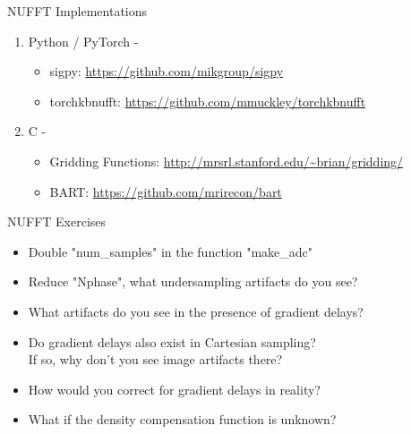 \begin{frame}{NUFFT Implementations}
    \begin{enumerate}
        \item Python / PyTorch -
        \vspace{1em}
        \begin{itemize}
            \item sigpy: \url{https://github.com/mikgroup/sigpy}
            \vspace{0.5em}
            \item torchkbnufft: \url{https://github.com/mmuckley/torchkbnufft}
        \end{itemize}

        \vspace{2em}
        \item C -
        \vspace{1em}
        \begin{itemize}
            \item Gridding Functions: \url{http://mrsrl.stanford.edu/~brian/gridding/}
            \vspace{0.5em}
            \item BART: \url{https://github.com/mrirecon/bart}
        \end{itemize}
    \end{enumerate}
\end{frame}


\begin{frame}{NUFFT Exercises}
	\begin{itemize}
		\item <1-> Double "num\_samples" in the function "make\_adc"
		\vspace{1em}
        \item <2-> Reduce "Nphase", what undersampling artifacts do you see?
        \vspace{1em}
		\item <3-> What artifacts do you see in the presence of gradient delays?
		\vspace{1em}
		\item <4-> Do gradient delays also exist in Cartesian sampling? \\
		If so, why don't you see image artifacts there?
		\vspace{1em}
        \item <5-> How would you correct for gradient delays in reality?
		\vspace{1em}
        \item <6-> What if the density compensation function is unknown?
	\end{itemize}
\end{frame}
